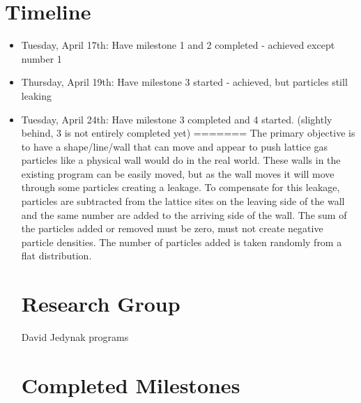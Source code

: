 \documentclass{article}
\begin{document}
\section{Timeline}
\begin{itemize}
  \item Tuesday, April 17th: Have milestone 1 and 2 completed - achieved except number 1
  \item Thursday, April 19th: Have milestone 3 started - achieved, but particles still leaking
  \item Tuesday, April 24th: Have milestone 3 completed and 4 started. (slightly behind, 3 is not entirely completed yet)
=======
The primary objective is to have a shape/line/wall that can move and appear to push lattice gas particles like a physical wall would do in the real world. These walls in the existing program can be easily moved, but as the wall moves it will move through some particles creating a leakage. To compensate for this leakage, particles are subtracted from the lattice sites on the leaving side of the wall and the same number are added to the arriving side of the wall. The sum of the particles added or removed must be zero, must not create negative particle densities. The number of particles added is taken randomly from a flat distribution. 
\section{Research Group}
David Jedynak programs 
\section{Completed Milestones}


\end{itemize}
\end{document}
